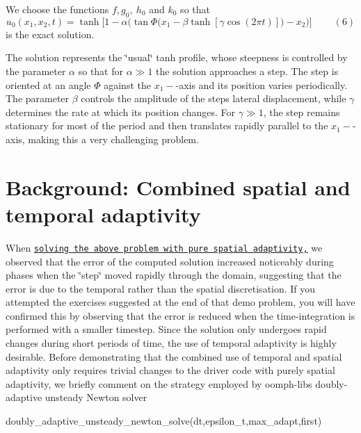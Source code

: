 We choose the functions $ f, g_0, \ h_0$ and $ k_0$ so that \[ u_0(x_1,x_2,t) = \tanh\bigg[1-\alpha\bigg(\tan\Phi \big(x_1-\beta\tanh[ \gamma\cos\left(2\pi t\right)]\big)- x_2\bigg)\bigg] \ \ \ \ \ \ \ \ \ \ (6) \] is the exact solution.

The solution represents the \char`\"{}usual\char`\"{} tanh profile, whose steepness is controlled by the parameter $ \alpha $ so that for $ \alpha \gg 1 $ the solution approaches a step. The step is oriented at an angle $ \Phi $ against the $ x_1-$-\/axis and its position varies periodically. The parameter $ \beta $ controls the amplitude of the step\textquotesingle{}s lateral displacement, while $ \gamma $ determines the rate at which its position changes. For $ \gamma \gg 1$, the step remains stationary for most of the period and then translates rapidly parallel to the $ x_1-$-\/axis, making this a very challenging problem.



 

\hypertarget{index_comb}{}\section{Background\+: Combined spatial and temporal adaptivity}\label{index_comb}
When \href{../../two_d_unsteady_heat_ALE/html/index.html}{\tt solving the above problem with pure spatial adaptivity,} we observed that the error of the computed solution increased noticeably during phases when the \char`\"{}step\char`\"{} moved rapidly through the domain, suggesting that the error is due to the temporal rather than the spatial discretisation. If you attempted the exercises suggested at the end of that demo problem, you will have confirmed this by observing that the error is reduced when the time-\/integration is performed with a smaller timestep. Since the solution only undergoes rapid changes during short periods of time, the use of temporal adaptivity is highly desirable. Before demonstrating that the combined use of temporal and spatial adaptivity only requires trivial changes to the driver code with purely spatial adaptivity, we briefly comment on the strategy employed by {\ttfamily oomph-\/lib\textquotesingle{}s} doubly-\/adaptive unsteady Newton solver


\begin{DoxyCode}
doubly\_adaptive\_unsteady\_newton\_solve(dt,epsilon\_t,max\_adapt,first)
\end{DoxyCode}


